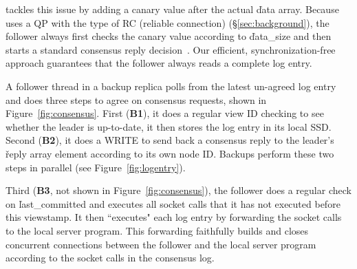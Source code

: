\xxx tackles this issue by adding a canary value after the actual \v{data} 
array. Because \xxx uses a QP with the type of RC (reliable connection) 
(\S\ref{sec:background}), the follower always first checks the canary value 
according to \v{data\_size} and then starts a standard \paxos consensus reply 
decision~\cite{paxos:practical}. Our efficient, synchronization-free approach 
guarantees that the follower always reads a complete log entry.
% 

A follower thread in a backup replica polls from the latest un-agreed log 
entry and does three steps to agree on consensus requests, shown in 
Figure~\ref{fig:consensus}. First (\textbf{B1}), it does a regular \paxos view 
ID checking to see whether the leader is up-to-date, it then stores the log 
entry in its local SSD. Second (\textbf{B2}), it does a WRITE to send back 
a consensus reply to the leader's \v{reply} array element according to its 
own node ID. Backups perform these two steps in parallel 
(see Figure~\ref{fig:logentry}).

Third (\textbf{B3}, not shown in Figure~\ref{fig:consensus}), the follower 
does a regular \paxos check on \v{last\_committed} and executes all socket 
calls that it has not executed before this viewstamp. It then ``executes" each 
log entry by forwarding the socket calls to the local server program. This 
forwarding faithfully builds and closes concurrent connections between the 
follower and the local server program according to the socket calls in the 
consensus log.




